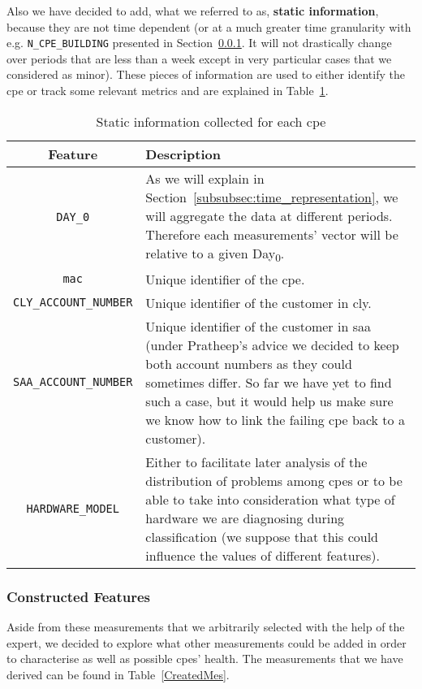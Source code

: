 Also we have decided to add, what we referred to as, \textbf{static information}, because they are not time dependent (or at a much greater time granularity with e.g. \texttt{N\_CPE\_BUILDING} presented in Section~\ref{subsubsec:constructed_features}. It will not drastically change over periods that are less than a week except in very particular cases that we considered as minor). These pieces of information are used to either identify the \acrshort{cpe} or track some relevant metrics and are explained in Table~\ref{StaticInfos}.

\begin{table}[h]
\begin{center}
\begin{tabular}{c p{100mm}}
\hline
\textbf{Feature} & \textbf{Description}\\ 
\hline\hline
\texttt{DAY\_0} & As we will explain in Section~\ref{subsubsec:time_representation}, we will aggregate the data at different periods. Therefore each measurements' vector will be relative to a given Day\textsubscript{0}.\\
\hline
\texttt{\acrshort{mac}} & Unique identifier of the \acrshort{cpe}.\\
\hline
\texttt{CLY\_ACCOUNT\_NUMBER} & Unique identifier of the customer in \acrlong{cly}.\\
\hline
\texttt{SAA\_ACCOUNT\_NUMBER} & Unique identifier of the customer in \acrlong{saa} (under Pratheep's advice we decided to keep both account numbers as they could sometimes differ. So far we have yet to find such a case, but it would help us make sure we know how to link the failing \acrshort{cpe} back to a customer).\\
\hline
\texttt{HARDWARE\_MODEL} & Either to facilitate later analysis of the distribution of problems among \acrshort{cpe}s  or to be able to take into consideration what type of hardware we are diagnosing during classification (we suppose that this could influence the values of different features).\\
\end{tabular}
\end{center}
\caption{\label{StaticInfos}Static information collected for each \acrshort{cpe}}
\end{table}

\subsubsection{Constructed Features}
\label{subsubsec:constructed_features}
Aside from these measurements that we arbitrarily selected with the help of the expert, we decided to explore what other measurements could be added in order to characterise as well as possible \acrshort{cpe}s' health. The measurements that we have derived can be found in Table~\ref{CreatedMes}.

